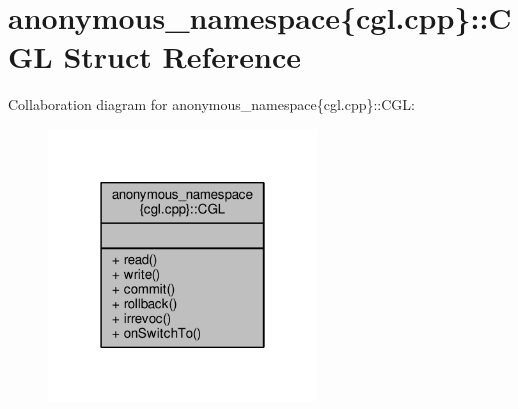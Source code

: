 \hypertarget{structanonymous__namespace_02cgl_8cpp_03_1_1CGL}{\section{anonymous\-\_\-namespace\{cgl.\-cpp\}\-:\-:C\-G\-L Struct Reference}
\label{structanonymous__namespace_02cgl_8cpp_03_1_1CGL}
}


Collaboration diagram for anonymous\-\_\-namespace\{cgl.\-cpp\}\-:\-:C\-G\-L\-:
\nopagebreak
\begin{figure}[H]
\begin{center}
\leavevmode
\includegraphics[width=202pt]{structanonymous__namespace_02cgl_8cpp_03_1_1CGL__coll__graph}
\end{center}
\end{figure}
